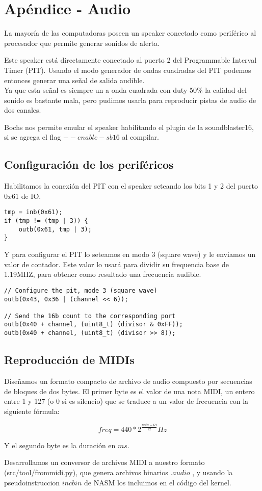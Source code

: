 \section{Apéndice - Audio}

La mayoría de las computadoras poseen un speaker conectado como periférico
al procesador que permite generar sonidos de alerta.

Este speaker está directamente conectado al puerto 2 del Programmable Interval Timer (PIT).
Usando el modo generador de ondas cuadradas del PIT podemos entonces generar una señal de salida audible. \\
Ya que esta señal es siempre un a onda cuadrada con duty 50\% la calidad del sonido es bastante mala,
pero pudimos usarla para reproducir pistas de audio de dos canales.

Bochs nos permite emular el speaker habilitando el plugin de la soundblaster16, si se agrega el flag $--enable-sb16$ al compilar.

\subsection{Configuración de los periféricos}
\label{audio}

Habilitamos la conexión del PIT con el speaker seteando los bits 1 y 2 del puerto $0x61$ de IO.

\begin{lstlisting}
tmp = inb(0x61);
if (tmp != (tmp | 3)) {
    outb(0x61, tmp | 3);
}
\end{lstlisting}

Y para configurar el PIT lo seteamos en modo 3 (square wave) y le enviamos un valor de contador.
Este valor lo usará para dividir su frequencia base de 1.19MHZ, para obtener como resultado una frecuencia audible.

\begin{lstlisting}
// Configure the pit, mode 3 (square wave)
outb(0x43, 0x36 | (channel << 6));

// Send the 16b count to the corresponding port
outb(0x40 + channel, (uint8_t) (divisor & 0xFF));
outb(0x40 + channel, (uint8_t) (divisor >> 8));
\end{lstlisting}

\subsection{Reproducción de MIDIs}

Diseñamos un formato compacto de archivo de audio compuesto por secuencias de bloques de dos bytes.
El primer byte es el valor de una nota MIDI, un entero entre 1 y 127 (o 0 si es silencio) que se
traduce a un valor de frecuencia con la siguiente fórmula:

$$ freq = 440 * 2^{\frac{nota - 69}{12}} Hz $$

Y el segundo byte es la duración en $ms$.

Desarrollamos un conversor de archivos MIDI a nuestro formato (src/tool/frommidi.py),
que genera archivos binarios $.audio$ , y usando la pseudoinstruccion $incbin$ de NASM
los incluimos en el código del kernel.
